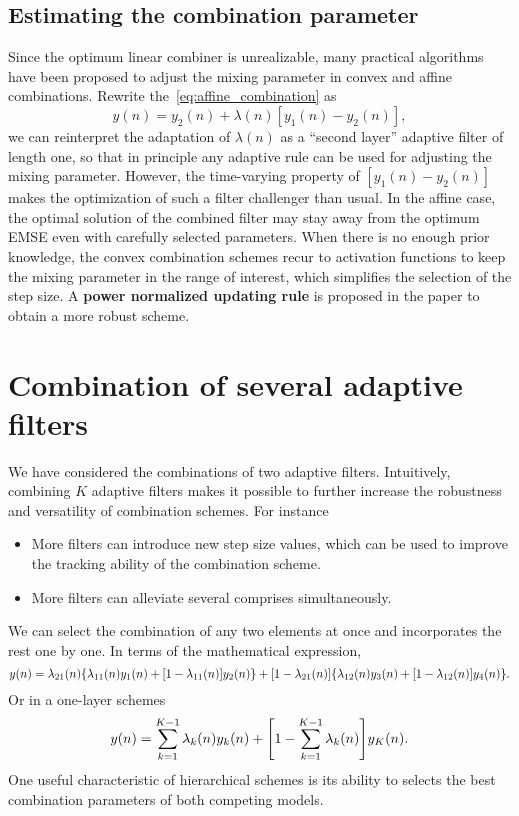 \documentclass[11pt]{article}
\begin{document}
\subsection{Estimating the combination parameter}\label{sec:estimating}
Since the optimum linear combiner is unrealizable, many practical algorithms have been proposed to adjust the mixing parameter in convex and affine combinations. Rewrite the~\cref{eq:affine_combination} as
\begin{equation}
    y(n) = y_2(n)+\lambda(n)[y_1(n)-y_2(n)],
\end{equation}
we can reinterpret the adaptation of $\lambda(n)$ as a ``second layer'' adaptive filter of length one, so that in principle any adaptive rule can be used for adjusting the mixing parameter. However, the time-varying property of $[y_1(n)-y_2(n)]$ makes the optimization of such a filter challenger than usual. In the affine case, the optimal solution of the combined filter may stay away from the optimum EMSE even with carefully selected parameters. When there is no enough prior knowledge, the convex combination schemes recur to activation functions to keep the mixing parameter in the range of interest, which simplifies the selection of the step size. A \textbf{power normalized updating rule} is proposed in the paper to obtain a more robust scheme.

\section{Combination of several adaptive filters}
We have considered the combinations of two adaptive filters. Intuitively, combining $K$ adaptive filters makes it possible to further increase the robustness and versatility of combination schemes. For instance
\begin{itemize}
    \item More filters can introduce new step size values, which can be used to improve the tracking ability of the combination scheme.
    \item More filters can alleviate several comprises simultaneously. 
\end{itemize}

We can select the combination of any two elements at once and incorporates the rest one by one. In terms of the mathematical expression,
\begin{equation}
    y(n) =\lambda_{21}(n)\braces*{\lambda_{11}(n)y_1(n)+\bracks*{1-\lambda_{11}(n)}y_2(n)}+\bracks*{1-\lambda_{21}(n)}\braces*{\lambda_{12}(n)y_3(n)+\bracks*{1-\lambda_{12}(n)}y_4(n)}.
\end{equation}
Or in a one-layer schemes
\begin{equation}
    y(n)=\sum_{k=1}^{K-1}\lambda_k(n)y_k(n)+\bracks*{1-\sum_{k=1}^{K-1}\lambda_k(n)}y_K(n).
\end{equation}
One useful characteristic of hierarchical schemes is its ability to selects the best combination parameters of both competing models.
\end{document}
